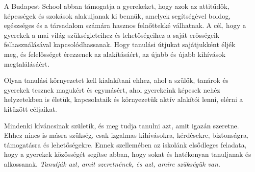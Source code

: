 
A Budapest School abban támogatja a gyerekeket, hogy azok az attitűdök,
képességek és szokások alakuljanak ki bennük, amelyek segítségével
boldog, egészséges és a társadalom számára hasznos felnőttekké
válhatnak. A cél, hogy a gyerekek a mai világ szükségleteihez és
lehetőségeihez a saját erősségeik felhasználásával kapcsolódhassanak.
Hogy tanulási útjukat sajátjukként éljék meg, és felelősséget érezzenek
az alakításáért, az újabb és újabb kihívások megtalálásáért.

Olyan tanulási környezetet kell kialakítani ehhez, ahol a szülők,
tanárok és gyerekek tesznek magukért és egymásért, ahol gyerekeink
képesek nehéz helyzetekben is életük, kapcsolataik és környezetük aktív
alakítói lenni, elérni a kitűzött céljaikat.

Mindenki kíváncsinak születik, és meg tudja tanulni azt, amit igazán
szeretne. Ehhez nincs is másra szükség, csak izgalmas kihívásokra,
kérdésekre, biztonságra, támogatásra és lehetőségekre. Ennek szellemében
az iskolánk elsődleges feladata, hogy a gyerekek közösségét segítse
abban, hogy sokat és hatékonyan tanuljanak és alkossanak. \emph{Tanulják
azt, amit szeretnének, és azt, amire szükségük van.}
